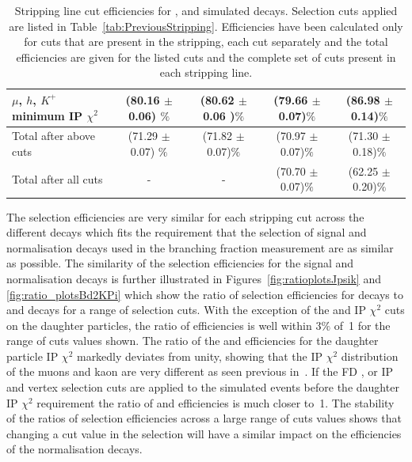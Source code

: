 {\begin{landscape}
\begin{table}[htbp]
\begin{center}
\begin{tabular}{p{6cm}cccc}
$\mu$, $h$, $K^{+}$ minimum IP $\chi^{2}$    & (80.16 $\pm$ 0.06) $\%$  & (80.62 $\pm$ 0.06 )$\%$        & (79.66 $\pm$ 0.07)$\%$        & (86.98 $\pm$ 0.14)$\%$ \\
\hline
Total after above cuts                  & (71.29 $\pm$  0.07) $\%$  & (71.82 $\pm$ 0.07)$\%$        & (70.97 $\pm$ 0.07)$\%$        & (71.30 $\pm$ 0.18)$\%$ \\
\hline
Total after all cuts      & -                         & -                             & (70.70 $\pm$ 0.07)$\%$        & (62.25 $\pm$ 0.20)$\%$ \\
\hline
\end{tabular}
\vspace{0.7cm}
\caption{Stripping line cut efficiencies for \bsmumu, \bhh and  simulated decays. Selection cuts applied are listed in Table~\ref{tab:PreviousStripping}. Efficiencies have been calculated only for cuts that are present in the \bsmumu stripping, each cut separately and the total efficiencies are given for the listed cuts and the complete set of cuts present in each stripping line. }
\label{tab:Run1strippingEff}
\end{center}
\end{table}
\vspace*{\fill}
\end{landscape}
}


The selection efficiencies are very similar for each stripping cut across the different decays which fits the requirement that the selection of signal and normalisation decays used in the branching fraction measurement are as similar as possible. The similarity of the selection efficiencies for the signal and normalisation decays is further illustrated in Figures~\ref{fig:ratioplotsJpsik} and \ref{fig:ratio_plotsBd2KPi} which show the ratio of selection efficiencies for \bsmumu decays to \bujpsik and \bdkpi decays for a range of selection cuts. With the exception of the \bsmumu and \bujpsik IP $\chi^{2}$ cuts on the daughter particles, the ratio of efficiencies is well within $3\%$ of~1 for the range of cuts values shown. The ratio of the \bsmumu and \bujpsik efficiencies for the daughter particle IP $\chi^{2}$ markedly deviates from unity, showing that the IP $\chi^{2}$ distribution of the muons and kaon are very different as seen previous in~\cite{Diego}. If the FD \chisqd, \bs or \jpsi IP \chisqd and vertex \chisqd selection cuts are applied to the simulated events before the daughter IP $\chi^{2}$ requirement the ratio of \bmumu and \bujpsik efficiencies is much closer to~1. The stability of the ratios of selection efficiencies across a large range of cuts values shows that changing a cut value in the \bmumu selection will have a similar impact on the efficiencies of the normalisation decays. 


